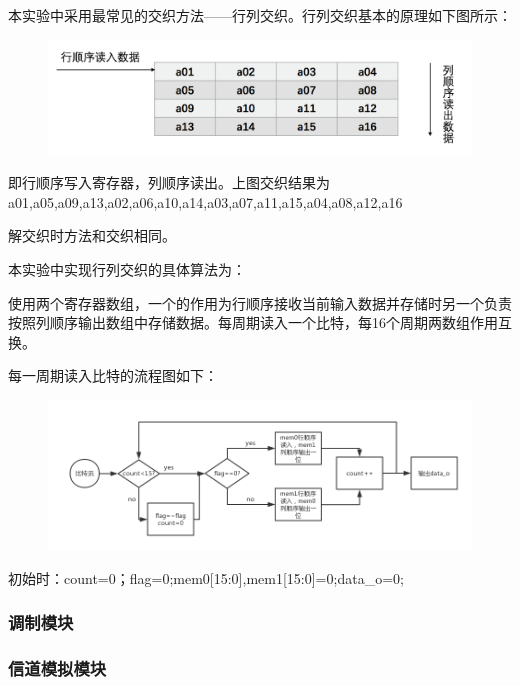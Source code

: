 \documentclass[UTF8]{ctexart}
\begin{document}
本实验中采用最常见的交织方法——行列交织。行列交织基本的原理如下图所示：

\begin{figure}[H]
    \centering
    \includegraphics[width=\textwidth]{images//inter_input.png}
\end{figure}

即行顺序写入寄存器，列顺序读出。上图交织结果为a01,a05,a09,a13,a02,a06,a10,a14,a03,a07,a11,a15,a04,a08,a12,a16

解交织时方法和交织相同。

本实验中实现行列交织的具体算法为：

使用两个寄存器数组，一个的作用为行顺序接收当前输入数据并存储时另一个负责按照列顺序输出数组中存储数据。每周期读入一个比特，每16个周期两数组作用互换。

每一周期读入比特的流程图如下：

\begin{figure}[H]
    \centering
    \includegraphics[width=\textwidth]{images//inter_pic.png}
\end{figure}

初始时：count=0；flag=0;mem0[15:0],mem1[15:0]=0;data\_o=0;

\newpage

\subsubsection{调制模块}

\subsubsection{信道模拟模块}
\end{document}
